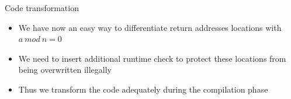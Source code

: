 \documentclass{beamer}
\begin{document}
%
%
%
%

\begin{frame}[c]{Code transformation}
	\begin{itemize}\itemsep20pt
		\item We have now an easy way to differentiate return addresses locations with $a~mod~n=0$
		\item We need to insert additional runtime check to protect these locations from being overwritten illegally
		\item Thus we transform the code adequately during the compilation phase
	\end{itemize}
\end{frame}
\end{document}
